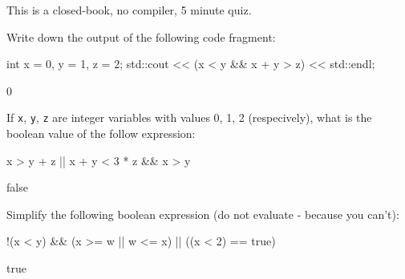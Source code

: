 

This is a closed-book, no compiler, 5 minute quiz.

\nextq
Write down the output of the following code fragment:
\begin{console}
int x = 0, y = 1, z = 2;
std::cout << (x < y && x + y > z) << std::endl;
\end{console}
\ANSWER
\begin{answercode}
0
\end{answercode}

\nextq
If \verb!x!, \verb!y!, \verb!z! are integer variables with values 0, 1, 2
(respecively),
what is the boolean value of the follow expression:
\begin{console}
x > y + z || x + y < 3 * z && x > y
\end{console}
\ANSWER
\begin{answercode}
false
\end{answercode}

\nextq
Simplify the following boolean expression (do not evaluate - because you can't):
\begin{console}
!(x < y) && (x >= w || w <= x) || ((x < 2) == true)
\end{console}
\ANSWER
\begin{answercode}
true
\end{answercode}

